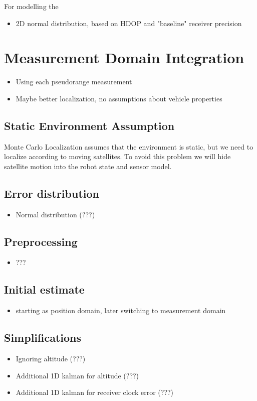 For modelling the
\cite{www-wilson}

\begin{itemize}
\item 2D normal distribution, based on HDOP and "baseline" receiver precision
\end{itemize}

\section{Measurement Domain Integration}
\label{sec:measurement_domain}
\begin{itemize}
\item Using each pseudorange measurement
\item Maybe better localization, no assumptions about vehicle properties
\end{itemize}

\subsection{Static Environment Assumption}
\label{sec:gps-mcl-static-env}
Monte Carlo Localization assumes that the environment is static, but we need to
localize according to moving satellites.
To avoid this problem we will hide satellite motion into the robot state and sensor model.

\subsection{Error distribution}
\begin{itemize}
\item Normal distribution (???)
\end{itemize}

\subsection{Preprocessing}
\begin{itemize}
\item ???
\end{itemize}

\subsection{Initial estimate}
\begin{itemize}
\item starting as position domain, later switching to measurement domain
\end{itemize}

\subsection{Simplifications}
\begin{itemize}
\item Ignoring altitude (???)
\item Additional 1D kalman for altitude (???)
\item Additional 1D kalman for receiver clock error (???)
\end{itemize}
